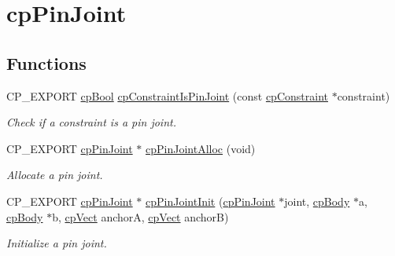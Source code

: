 \hypertarget{group__cp_pin_joint}{}\section{cp\+Pin\+Joint}
\label{group__cp_pin_joint}
\subsection*{Functions}
\begin{DoxyCompactItemize}
\item 
\mbox{\label{group__cp_pin_joint_ga4f0d415dd1800c41496a9585a33eabe7}} 
C\+P\+\_\+\+E\+X\+P\+O\+RT \mbox{\hyperlink{group__basic_types_gabc5e752c48f3449ca26ef413ecbd647e}{cp\+Bool}} \mbox{\hyperlink{group__cp_pin_joint_ga4f0d415dd1800c41496a9585a33eabe7}{cp\+Constraint\+Is\+Pin\+Joint}} (const \mbox{\hyperlink{structcp_constraint}{cp\+Constraint}} $\ast$constraint)
\begin{DoxyCompactList}\small\item\em Check if a constraint is a pin joint. \end{DoxyCompactList}\item 
\mbox{\label{group__cp_pin_joint_ga1d8f64aba4c871ae458934ca9e9f267e}} 
C\+P\+\_\+\+E\+X\+P\+O\+RT \mbox{\hyperlink{structcp_pin_joint}{cp\+Pin\+Joint}} $\ast$ \mbox{\hyperlink{group__cp_pin_joint_ga1d8f64aba4c871ae458934ca9e9f267e}{cp\+Pin\+Joint\+Alloc}} (void)
\begin{DoxyCompactList}\small\item\em Allocate a pin joint. \end{DoxyCompactList}\item 
\mbox{\label{group__cp_pin_joint_ga6b3b03ab0d478c8110dacfdb33b05d4d}} 
C\+P\+\_\+\+E\+X\+P\+O\+RT \mbox{\hyperlink{structcp_pin_joint}{cp\+Pin\+Joint}} $\ast$ \mbox{\hyperlink{group__cp_pin_joint_ga6b3b03ab0d478c8110dacfdb33b05d4d}{cp\+Pin\+Joint\+Init}} (\mbox{\hyperlink{structcp_pin_joint}{cp\+Pin\+Joint}} $\ast$joint, \mbox{\hyperlink{structcp_body}{cp\+Body}} $\ast$a, \mbox{\hyperlink{structcp_body}{cp\+Body}} $\ast$b, \mbox{\hyperlink{structcp_vect}{cp\+Vect}} anchorA, \mbox{\hyperlink{structcp_vect}{cp\+Vect}} anchorB)
\begin{DoxyCompactList}\small\item\em Initialize a pin joint. \end{DoxyCompactList}\item 

\end{DoxyCompactItemize}

